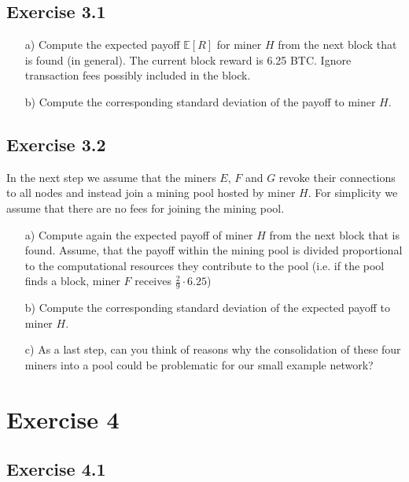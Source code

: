\documentclass[12pt]{article}
\begin{document}
	\subsection*{Exercise 3.1}
	\begin{itemize}
		\item[a)] Compute the expected payoff $\mathbb{E}[R]$ for miner $H$ from the next block that is found (in general). The current block reward is 6.25 BTC. Ignore transaction fees possibly included in the block.
		\item[b)] Compute the corresponding standard deviation of the payoff to miner $H$.
	\end{itemize}
	
	\subsection*{Exercise 3.2}
	
	In the next step we assume that the miners $E$, $F$ and $G$ revoke their connections to all nodes and instead join a mining pool hosted by miner $H$. For simplicity we assume that there are no fees for joining the mining pool.
	
	\begin{itemize}
		\item[a)] Compute again the expected payoff of miner $H$ from the next block that is found. Assume, that the payoff within the mining pool is divided proportional to the computational resources they contribute to the pool (i.e. if the pool finds a block, miner $F$ receives $\frac{2}{9} \cdot 6.25$)
		\item[b)] Compute the corresponding standard deviation of the expected payoff to miner $H$.
		\item[c)] As a last step, can you think of reasons why the consolidation of these four miners into a pool could be problematic for our small example network?
	\end{itemize}
	
	\newpage
	
	\section*{Exercise 4}
	
	\subsection*{Exercise 4.1}
	
\end{document}
